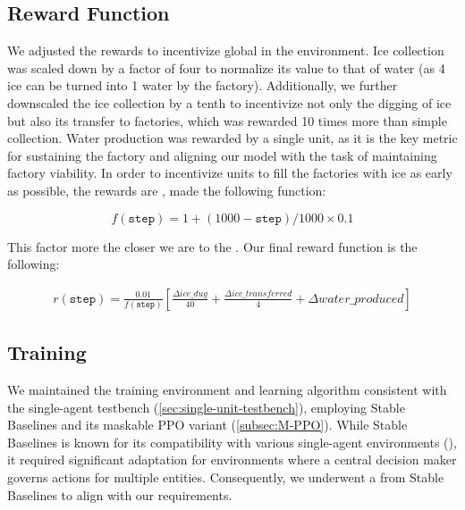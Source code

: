 \subsection{Reward Function}
\label{sec:monolithic-reward-function}

\noindent We adjusted the rewards to incentivize global  in the environment. Ice collection was scaled down by a factor of four to normalize its value to that of water (as 4 ice can be turned into 1 water by the factory). Additionally, we further downscaled the ice collection by a tenth to incentivize not only the digging of ice but also its transfer to factories, which was rewarded 10 times more than simple collection. Water production was rewarded by a single unit, as it is the key metric for sustaining the factory and aligning our model with the task of maintaining factory viability. In order to incentivize units to fill the factories with ice as early as possible, the rewards are , made the following function:

\begin{equation}
    f(\texttt{step}) = 1 + (1000 - \texttt{step}) / 1000 \times 0.1
    \label{eq:reward-early-scaling}
\end{equation}

\noindent This factor  more the closer we are to the . Our final reward function is the following: 

\begin{align}
    r(\texttt{step}) = \frac{0.01}{f(\texttt{step})} \left[ 
    \frac{\Delta ice\_dug}{40} 
    + \frac{\Delta ice\_transferred}{4} 
    + \Delta water\_produced
    \right]
    \label{eq:reward-mono}
\end{align}

\subsection{Training}
\label{sec:monolithic-approach-training}

\noindent We maintained the training environment and learning algorithm consistent with the single-agent testbench (\autoref{sec:single-unit-testbench}), employing Stable Baselines and its maskable PPO variant (\autoref{subsec:M-PPO}). While Stable Baselines is known for its compatibility with various single-agent environments (\cite{stable-baselines3}), it required significant adaptation for environments where a central decision maker governs actions for multiple entities. Consequently, we underwent a  from Stable Baselines to align with our requirements.

